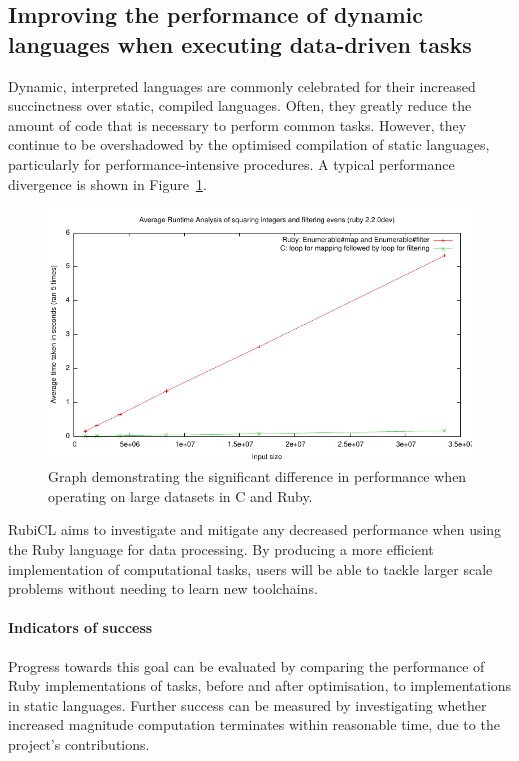 \subsection{Improving the performance of dynamic languages when executing data-driven tasks}
Dynamic, interpreted languages are commonly celebrated for their increased succinctness over static, compiled languages. Often, they greatly reduce the amount of code that is necessary to perform common tasks. However, they continue to be overshadowed by the optimised compilation of static languages, particularly for performance-intensive procedures. A typical performance divergence is shown in Figure~\ref{fig:ruby_vs_c}.

\begin{figure}[h]
  \includegraphics[width=\textwidth]{./figures/ruby_vs_c.pdf}
  \caption{Graph demonstrating the significant difference in performance when operating on large datasets in C and Ruby.}
  \label{fig:ruby_vs_c}
\end{figure}

RubiCL aims to investigate and mitigate any decreased performance when using the Ruby language for data processing. By producing a more efficient implementation of computational tasks, users will be able to tackle larger scale problems without needing to learn new toolchains.

\paragraph*{Indicators of success}
Progress towards this goal can be evaluated by comparing the performance of Ruby implementations of tasks, before and after optimisation, to implementations in static languages. Further success can be measured by investigating whether increased magnitude computation terminates within reasonable time, due to the project's contributions.

